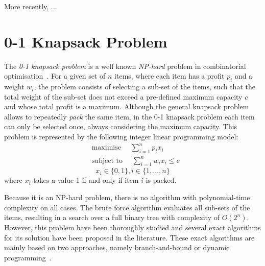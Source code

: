 More recently, \cite{ogilvie17}...


\section{0-1 Knapsack Problem}

The \textit{0-1 knapsack problem} is a well known \textit{NP-hard} problem in combinatorial optimisation~\cite{martello00}.
For a given set of $n$ items, where each item has a profit $p_i$ and a weight $w_i$, the problem consists of selecting a sub-set of the items, such that the total weight of the sub-set does not exceed a pre-defined maximum capacity $c$ and whose total profit is a maximum.
Although the general knapsack problem allows to repeatedly \textit{pack} the same item, in the 0-1 knapsack problem each item can only be selected once, always considering the maximum capacity.
This problem is represented by the following integer linear programming model:
\begin{equation*}
\begin{aligned}
& \textrm{maximise }\quad \sum_{i=1}^{n} p_ix_i \\
& \textrm{subject to }\quad \sum_{i=1}^{n} w_ix_i \leq c
\end{aligned}
\end{equation*}
\[
x_i\in\{0,1\}, i\in\{1,\ldots,n\}
\]
where $x_i$ takes a value 1 if and only if item $i$ is packed.

Because it is an NP-hard problem, there is no algorithm with polynomial-time complexity on all cases.
The brute force algorithm evaluates all sub-sets of the items, resulting in a search over a full binary tree with complexity of $O(2^n)$.
However, this problem have been thoroughly studied and several exact algorithms for its solution have been proposed in the literature.
These exact algorithms are mainly based on two approaches, namely branch-and-bound or dynamic programming~\citep{martello77,martello99}.

